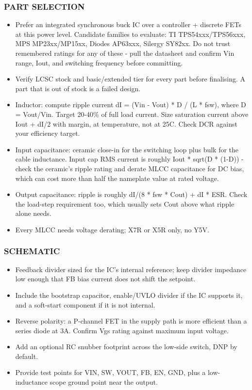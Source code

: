 \documentclass[11pt,a4paper]{article}
\begin{document}
\subsubsection*{PART SELECTION}
\begin{itemize}
\item Prefer an integrated synchronous buck IC over a controller + discrete FETs at
this power level. Candidate families to evaluate: TI TPS54xxx/TPS56xxx, MPS
MP23xx/MP15xx, Diodes AP63xxx, Silergy SY82xx. Do not trust remembered ratings
for any of these - pull the datasheet and confirm Vin range, Iout, and switching
frequency before committing.
\item Verify LCSC stock and basic/extended tier for every part before finalising. A
part that is out of stock is a failed design.
\item Inductor: compute ripple current dI = (Vin - Vout) {*} D / (L {*} fsw), where
D = Vout/Vin. Target 20-40\% of full load current. Size saturation current above
Iout + dI/2 with margin, at temperature, not at 25C. Check DCR against your
efficiency target.
\item Input capacitance: ceramic close-in for the switching loop plus bulk for the
cable inductance. Input cap RMS current is roughly Iout {*} sqrt(D {*} (1-D)) -
check the ceramic's ripple rating and derate MLCC capacitance for DC bias, which
can cost more than half the nameplate value at rated voltage.
\item Output capacitance: ripple is roughly dI/(8 {*} fsw {*} Cout) + dI {*} ESR. Check the
load-step requirement too, which usually sets Cout above what ripple alone needs.
\item Every MLCC needs voltage derating; X7R or X5R only, no Y5V.
\end{itemize}
\subsubsection*{SCHEMATIC}
\begin{itemize}
\item Feedback divider sized for the IC's internal reference; keep divider impedance low
enough that FB bias current does not shift the setpoint.
\item Include the bootstrap capacitor, enable/UVLO divider if the IC supports it, and a
soft-start component if it is not internal.
\item Reverse polarity: a P-channel FET in the supply path is more efficient than a
series diode at 3A. Confirm Vgs rating against maximum input voltage.
\item Add an optional RC snubber footprint across the low-side switch, DNP by default.
\item Provide test points for VIN, SW, VOUT, FB, EN, GND, plus a low-inductance scope
ground point near the output.
\end{itemize}
\end{document}
